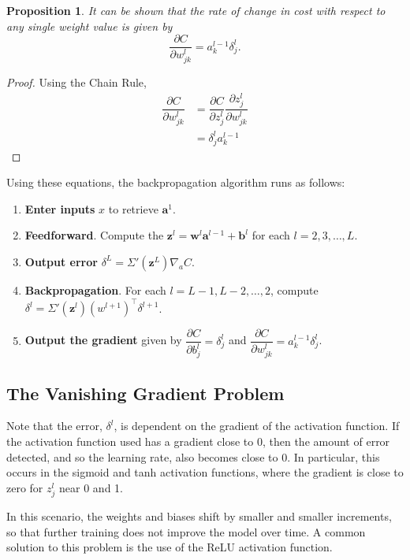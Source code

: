 \documentclass[honours,12pt]{unswthesis}
\newtheorem{proposition}[theorem]{Proposition}
\numberwithin{equation}{section}
\begin{document}
\begin{proposition}
	It can be shown that the rate of change in cost with respect to any single weight value is given by
	\[
		\dfrac{\partial C}{\partial w_{jk}^l} = a_k^{l-1}\delta_j^l.
	\]
\end{proposition}
\begin{proof}
	Using the Chain Rule,
	\begin{align*}
		\dfrac{\partial C}{\partial w_{jk}^l} & = \dfrac{\partial C}{\partial z_j^l}\dfrac{\partial z_j^l}{\partial w_{jk}^l} \\
		& = \delta_j^l a_k^{l-1}
	\end{align*}
\end{proof}


Using these equations, the backpropagation algorithm runs as follows:
\begin{enumerate}
	\item \textbf{Enter inputs }$x$ to retrieve $\mathbf{a}^1$.
	\item \textbf{Feedforward}. Compute the $\mathbf{z}^l = \mathbf{w}^l\mathbf{a}^{l-1} + \mathbf{b}^l$ for each $l = 2, 3,\ldots,L$.
	\item \textbf{Output error }$\delta^L = \Sigma'(\mathbf{z}^L)\nabla_aC$.
	\item \textbf{Backpropagation}. For each $l = L-1, L-2, \ldots, 2$, compute $\delta^l =  \Sigma'(\mathbf{z}^l)(w^{l+1})^\top\delta^{l+1}$.
	\item \textbf{Output the gradient} given by $\dfrac{\partial C}{\partial b_j^l} = \delta_j^l$ and $\dfrac{\partial C}{\partial w_{jk}^l} = a_k^{l-1}\delta_j^l$.
\end{enumerate}


\subsection{The Vanishing Gradient Problem}
Note that the error, $\delta^l$, is dependent on the gradient of the activation function. If the activation function used has a gradient close to 0, then the amount of error detected, and so the learning rate, also becomes close to 0. In particular, this occurs in the sigmoid and tanh activation functions, where the gradient is close to zero for $z_j^l$ near 0 and 1.

In this scenario, the weights and biases shift by smaller and smaller increments, so that further training does not improve the model over time. A common solution to this problem is the use of the ReLU activation function.
\end{document}
